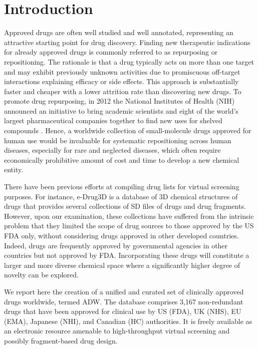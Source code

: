\documentclass{bioinfo}
\begin{document}
\maketitle

\section{Introduction}

Approved drugs are often well studied and well annotated, representing an attractive starting point for drug discovery. Finding new therapeutic indications for already approved drugs is commonly referred to as repurposing or repositioning. The rationale is that a drug typically acts on more than one target and may exhibit previously unknown activities due to promiscuous off-target interactions explaining efficacy or side effects. This approach is substantially faster and cheaper with a lower attrition rate than discovering new drugs. To promote drug repurposing, in 2012 the National Institutes of Health (NIH) announced an initiative to bring academic scientists and eight of the world's largest pharmaceutical companies together to find new uses for shelved compounds \citep{1715}. Hence, a worldwide collection of small-molecule drugs approved for human use would be invaluable for systematic repositioning across human diseases, especially for rare and neglected diseases, which often require economically prohibitive amount of cost and time to develop a new chemical entity.

There have been previous efforts at compiling drug lists for virtual screening purposes. For instance, e-Drug3D \citep{1125} is a database of 3D chemical structures of drugs that provides several collections of SD files of drugs and drug fragments. However, upon our examination, these collections have suffered from the intrinsic problem that they limited the scope of drug sources to those approved by the US FDA only, without considering drugs approved in other developed countries. Indeed, drugs are frequently approved by governmental agencies in other countries but not approved by FDA. Incorporating these drugs will constitute a larger and more diverse chemical space where a significantly higher degree of novelty can be explored.

We report here the creation of a unified and curated set of clinically approved drugs worldwide, termed ADW. The database comprises 3,167 non-redundant drugs that have been approved for clinical use by US (FDA), UK (NHS), EU (EMA), Japanese (NHI), and Canadian (HC) authorities. It is freely available as an electronic resource amenable to high-throughput virtual screening and possibly fragment-based drug design.
\end{document}
